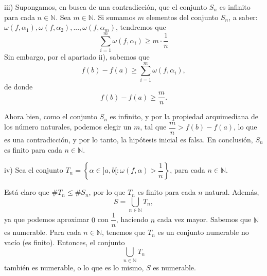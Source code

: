 \documentclass[10pt,a4paper]{article}
\begin{document}
	iii) Supongamos, en busca de una contradicción, que el conjunto $S_n$ es infinito para cada $n \in \mathbb{N}$. Sea $m \in \mathbb{N}$. Si sumamos $m$ elementos del conjunto $S_n$, a saber: $\omega(f, \alpha_1), \omega(f, \alpha_2), ... , \omega(f, \alpha_m)$, tendremos que
	$$\sum_{i = 1}^{m} \omega(f, \alpha_i) \geq m \cdot \dfrac{1}{n}$$
	Sin embargo, por el apartado ii), sabemos que $$f(b)-f(a) \geq \sum_{i = 1}^{m} \omega(f, \alpha_i),$$ de donde $$f(b)-f(a) \geq \dfrac{m}{n}.$$
	
	Ahora bien, como el conjunto $S_n$ es infinito, y por la propiedad arquimediana de los número naturales, podemos elegir un $m$, tal que $\dfrac{m}{n} > f(b)-f(a)$, lo que es una contradicción, y por lo tanto, la hipótesis inicial es falsa. En conclusión, $S_n$ es finito para cada $n \in \mathbb{N}$. \newline
	
	iv) Sea el conjunto $T_n = \left\lbrace  \alpha \in ]a,b[ : \omega(f,\alpha) > \dfrac{1}{n}\right\rbrace$, para cada $n \in \mathbb{N}$.
	
	Está claro que $\# T_n \leq \#S_n$, por lo que $T_n$ es finito para cada $n$ natural. Además, $$S = \bigcup_{n \in \mathbb{N}} T_n,$$ ya que podemos aproximar $0$ con $\dfrac{1}{n}$, haciendo $n$ cada vez mayor.
	Sabemos que $\mathbb{N}$ es numerable. Para cada $n \in \mathbb{N}$, tenemos que $T_n$ es un conjunto numerable no vacío (es finito). Entonces, el conjunto $$\bigcup_{n \in \mathbb{N}}T_n$$ también es numerable, o lo que es lo mismo, $S$ es numerable.
\end{document}
